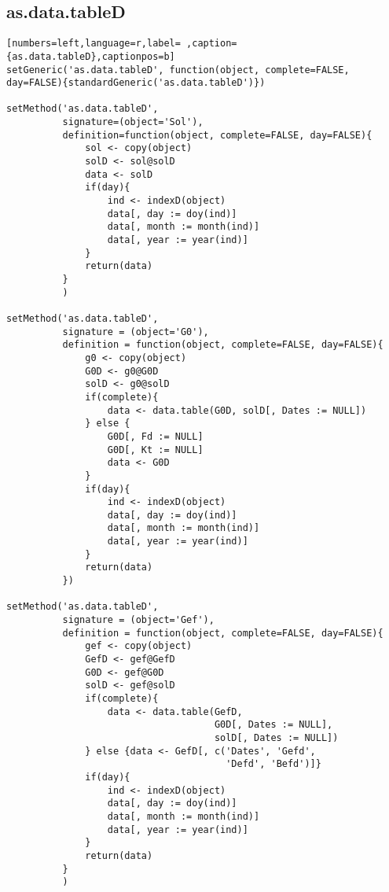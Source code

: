 \subsection{as.data.tableD}
\label{sec:org053cd06}
\label{subsec:as.data.tabled}
\begin{lstlisting}[numbers=left,language=r,label= ,caption={as.data.tableD},captionpos=b]
setGeneric('as.data.tableD', function(object, complete=FALSE, day=FALSE){standardGeneric('as.data.tableD')})

setMethod('as.data.tableD',
          signature=(object='Sol'),
          definition=function(object, complete=FALSE, day=FALSE){
              sol <- copy(object)
              solD <- sol@solD
              data <- solD
              if(day){
                  ind <- indexD(object)
                  data[, day := doy(ind)]
                  data[, month := month(ind)]
                  data[, year := year(ind)]
              }
              return(data)
          }
          )

setMethod('as.data.tableD',
          signature = (object='G0'),
          definition = function(object, complete=FALSE, day=FALSE){
              g0 <- copy(object)
              G0D <- g0@G0D
              solD <- g0@solD
              if(complete){
                  data <- data.table(G0D, solD[, Dates := NULL])
              } else {
                  G0D[, Fd := NULL]
                  G0D[, Kt := NULL]
                  data <- G0D
              }
              if(day){
                  ind <- indexD(object)
                  data[, day := doy(ind)]
                  data[, month := month(ind)]
                  data[, year := year(ind)]
              }
              return(data)
          })

setMethod('as.data.tableD',
          signature = (object='Gef'),
          definition = function(object, complete=FALSE, day=FALSE){
              gef <- copy(object)
              GefD <- gef@GefD
              G0D <- gef@G0D
              solD <- gef@solD
              if(complete){
                  data <- data.table(GefD,
                                     G0D[, Dates := NULL],
                                     solD[, Dates := NULL])
              } else {data <- GefD[, c('Dates', 'Gefd',
                                       'Defd', 'Befd')]}
              if(day){
                  ind <- indexD(object)
                  data[, day := doy(ind)]
                  data[, month := month(ind)]
                  data[, year := year(ind)]     
              }
              return(data)
          }
          )


\end{lstlisting}

